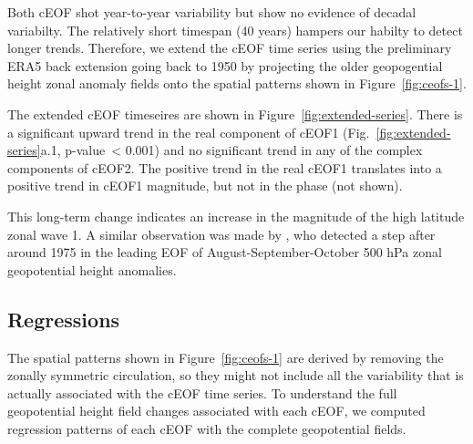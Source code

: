 \documentclass[smallextended]{svjour3}       %
\begin{document}
Both cEOF shot year-to-year variability but show no evidence of decadal variabilty. The relatively short timespan (40 years) hampers our habilty to detect longer trends. Therefore, we extend the cEOF time series using the preliminary ERA5 back extension going back to 1950 by projecting the older geopogential height zonal anomaly fields onto the spatial patterns shown in Figure~\ref{fig:ceofs-1}.

The extended cEOF timeseires are shown in Figure~\ref{fig:extended-series}. There is a significant upward trend in the real component of cEOF1 (Fig.~\ref{fig:extended-series}a.1, p-value~\textless{} 0.001) and no significant trend in any of the complex components of cEOF2. The positive trend in the real cEOF1 translates into a positive trend in cEOF1 magnitude, but not in the phase (not shown).

This long-term change indicates an increase in the magnitude of the high latitude zonal wave 1. A similar observation was made by \citet{raphael2003}, who detected a step after around 1975 in the leading EOF of August-September-October 500 hPa zonal geopotential height anomalies.

\hypertarget{regressions}{%
\subsection{Regressions}\label{regressions}}

The spatial patterns shown in Figure~\ref{fig:ceofs-1} are derived by removing the zonally symmetric circulation, so they might not include all the variability that is actually associated with the cEOF time series. To understand the full geopotential height field changes associated with each cEOF, we computed regression patterns of each cEOF with the complete geopotential fields.
\end{document}
